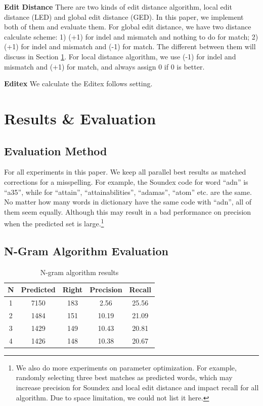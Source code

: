 \documentclass[11pt]{article}
\begin{document}
\noindent\textbf{Edit Distance} There are two kinds of edit distance algorithm, local edit distance (LED) and global edit distance (GED). In this paper,  we implement both of them and evaluate them. For global edit distance, we have two distance calculate scheme: 1) (+1) for indel and mismatch and nothing to do for match; 2) (+1) for indel and mismatch and (-1) for match. The different between them will discuss in Section \ref{lab:res}. For local distance algorithm, we use (-1) for indel and mismatch and (+1) for match, and always assign 0 if 0 is better.

\noindent\textbf{Editex} We calculate the Editex follows  \cite{Zobel1996PhoneticSM} setting.
 
\section{Results \& Evaluation}\label{lab:res}

\subsection{Evaluation Method}

For all experiments in this paper. We keep all parallel best results as matched corrections for a misspelling. For example, the Soundex code for word ``adn'' is ``a35'', while for ``attain'', ``attainabilities'', ``adamas'', ``atom'' etc. are the same. No matter how many words in dictionary have the same code with ``adn'', all of them seem equally. Although this may result in a bad performance on precision when the predicted set is large.\footnote{We also do more experiments on parameter optimization. For example, randomly selecting three best matches as predicted words, which may increase precision for Soundex and local edit distance and impact recall for all algorithm. Due to space limitation, we could not list it here.}

\subsection{N-Gram Algorithm Evaluation}

\begin{table}
	\centering
	\small
	\begin{tabular}{c|c|c|c|c}
		\hline
		N &Predicted & Right & Precision & Recall \\
		\hline
		1 & 7150 & 183 & 2.56 & 25.56 \\
		\hline
		2 & 1484 & 151 & 10.19 & 21.09  \\
		\hline
		3 & 1429 & 149 & 10.43 & 20.81 \\
		\hline
		4 & 1426 & 148 & 10.38 & 20.67 \\
		\hline
	\end{tabular}
	\caption{N-gram algorithm results}
	\label{tab:ngram}
\end{table}
\end{document}
